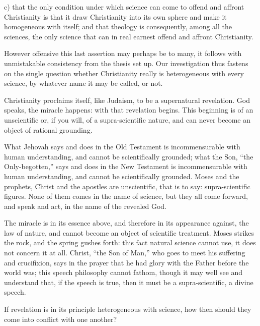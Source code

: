 \documentclass[12pt,a4paper]{book}
\begin{document}
c) that the only condition under which science can come to offend and affront
Christianity is that it draw Christianity into its own sphere and make it
homogeneous with itself; and that theology is consequently, among all the
sciences, the only science that can in real earnest offend and affront
Christianity.

However offensive this last assertion may perhaps be to many, it follows with
unmistakable consistency from the thesis set up. Our investigation thus fastens
on the single question whether Christianity really
is heterogeneous with every science, by whatever name it may be called, or not.

Christianity proclaims itself, like Judaism, to be a supernatural revelation.
God speaks, the miracle happens: with that revelation begins. This beginning is
of an unscientific or, if you will, of a supra-scientific nature, and can never
become an object of rational grounding.

What Jehovah says and does in the Old Testament is incommensurable with human
understanding, and cannot be scientifically grounded; what the Son, ``the
Only-begotten,'' says and does in the New Testament is incommensurable with
human understanding, and cannot be scientifically grounded. Moses and the
prophets, Christ and the apostles are unscientific, that is to say:
supra-scientific figures. None of them comes in the name of science, but they
all come forward, and speak and act, in the name of the revealed God.

The miracle is in its essence above, and therefore in its appearance against,
the law of nature, and cannot become an object of scientific treatment. Moses
strikes the rock, and the spring gushes forth: this fact natural science cannot
use, it does not concern it at all. Christ, ``the Son of Man,'' who goes to
meet his suffering and crucifixion, says in the prayer that he had glory with
the Father before the world was; this speech philosophy cannot fathom, though
it may well see and understand that, if the speech is true, then it must be a
supra-scientific, a divine speech.

If revelation is in its principle heterogeneous with science, how then should
they come into conflict with one another?
\end{document}
